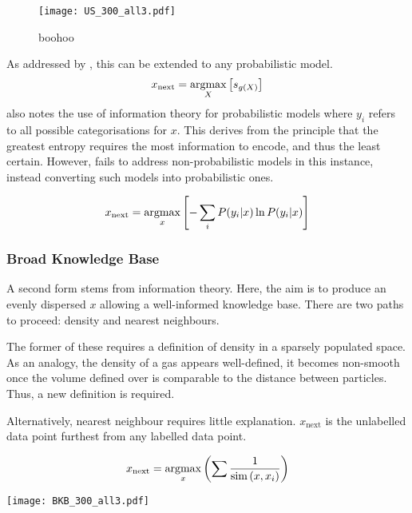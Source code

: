 \begin{figure}
  \begin{center}
    \texttt{[image: US\_300\_all3.pdf]}
    \caption{boohoo}
    \label{fig:BNB1}
  \end{center}

\end{figure}
As addressed by \textcite{Set09}, this can be extended to any probabilistic model.
\begin{equation}
  \label{eq:x_next1}
  x_\mathrm{next}=\operatorname*{argmax}_X{\left[s_{g(X)}\right]}
\end{equation}
\textcite{Set09} also notes the use of information theory for probabilistic models
where $y_i$ refers to all possible categorisations for $x$. This derives from the principle that the greatest entropy requires the most information to encode, and thus the least certain. However, \textcite{Set09} fails to address non-probabilistic models in this instance, instead converting such models into probabilistic ones.

\begin{equation}
  \label{eq:info_uncertainty}
  x_\mathrm{next}=\operatorname*{argmax}_x{\left[-\sum_i{P(y_i|x)\ln{P(y_i|x)}}\right]}
\end{equation}

\subsubsection{Broad Knowledge Base}
A second form stems from information theory. Here, the aim is to produce an evenly dispersed $x$ allowing a well-informed knowledge base. There are two paths to proceed: density and nearest neighbours.

The former of these requires a definition of density in a sparsely populated space. As an analogy, the density of a gas appears well-defined, it becomes non-smooth once the volume defined over is comparable to the distance between particles. Thus, a new definition is required.

Alternatively, nearest neighbour requires little explanation. $x_\mathrm{next}$ is the unlabelled data point furthest from any labelled data point.

\begin{equation}
  \label{eq:inverseSim}
  x_\mathrm{next}=\operatorname*{argmax}_x{\left(\sum{\frac{1}{\operatorname*{sim}{(x, x_i)}}}\right)}
\end{equation}

\begin{center}
  \texttt{[image: BKB\_300\_all3.pdf]}

\end{center}

